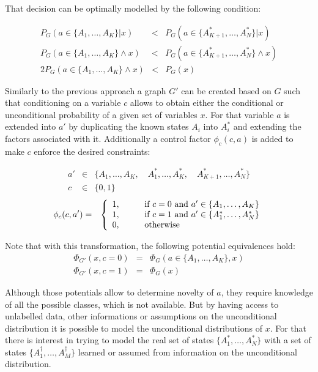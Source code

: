 That decision can be optimally modelled by the following condition:

\begin{eqnarray*}
P_G(a \in \{A_1,\dotsc, A_K\}|x) &<& P_G(a \in \{A^*_{K+1},\dotsc,A^*_N\}|x) \\
P_G(a \in \{A_1,\dotsc, A_K\} \land x) &<& P_G(a \in \{A^*_{K+1},\dotsc,A^*_N\} \land x) \\
2 P_G(a \in \{A_1,\dotsc, A_K\} \land x) &<& P_G(x)
\end{eqnarray*}

Similarly to the previous approach a graph $G'$ can be created based on $G$ such
that conditioning on a variable $c$ allows to obtain either the conditional or
unconditional probability of a given set of variables $x$.
For that variable $a$ is extended into $a'$ by duplicating the known states $A_i$
into $A^*_i$ and extending the factors associated with it.
Additionally a control factor $\phi_c(c, a)$ is added to make $c$ enforce the
desired constraints:

\begin{eqnarray*}
a' &\in& \{A_1, \dotsc, A_K,\quad A^*_1, \dots, A^*_K,\quad A^*_{K+1}, \dots, A^*_N\} \\
c &\in& \{0, 1\}
\end{eqnarray*}
\begin{eqnarray*}
\phi_c(c, a') &=& \left\{
  \begin{array}{l l}
    1, & \qquad \text{if } c = 0 \text{ and } a' \in \{A_1,\dotsc,A_K\} \\
    1, & \qquad \text{if } c = 1 \text{ and } a' \in \{A^*_1,\dotsc,A^*_N\}\\
    0, & \qquad \text{otherwise}
  \end{array} \right. \\
\end{eqnarray*}

Note that with this transformation, the following potential equivalences hold:
\begin{eqnarray*}
\Phi_{G'}(x, c=0) &=& \Phi_{G}(a \in \{A_1, \dots, A_K\}, x)\\
\Phi_{G'}(x, c=1) &=& \Phi_{G}(x) 
\end{eqnarray*}


Although those potentials allow to determine novelty of $a$, they require
knowledge of all the possible classes, which is not available.
But by having access to unlabelled data, other informations or assumptions on
the unconditional distribution it is possible to model the unconditional
distributions of $x$. For that there is interest in trying to model the real set
of states $\{A^*_1, \dots, A^*_N\}$ with a set of states $\{A^{\dag}_1, \dotsc, A^{\dag}_M\}$
learned or assumed from information on the unconditional distribution.

